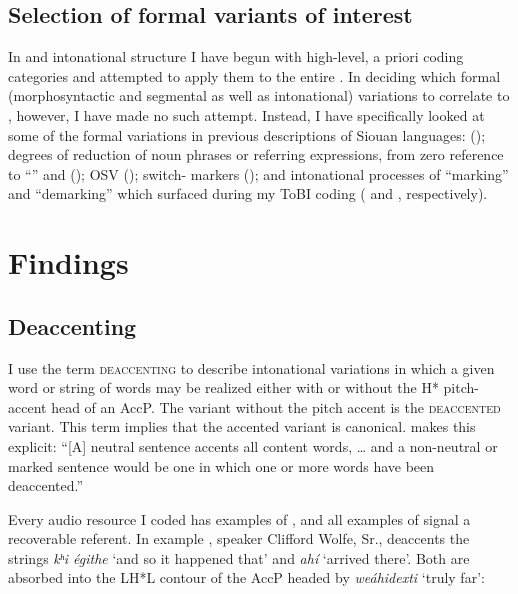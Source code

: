 \documentclass[output=paper]{LSP/langsci}
\begin{document}
\subsection{Selection of formal variants of interest}\label{variantselection}

In  and intonational structure I have begun with high-level, a priori coding categories and attempted to apply them to the entire . In deciding which formal (morphosyntactic and segmental as well as intonational) variations to correlate to , however, I have made no such attempt. Instead, I have specifically looked at some of the formal variations in previous descriptions of Siouan languages:  (); degrees of reduction of noun phrases or referring expressions, from zero reference to “” and  (); OSV  (); switch- markers (); and intonational processes of “marking” and “demarking” which surfaced during my ToBI coding ( and , respectively).

\section{Findings}\label{findings}

\subsection{Deaccenting}\label{deaccenting}

	I use the term \textsc{deaccenting} to describe intonational variations in which a given word or string of words may be realized either with or without the H* pitch-accent head of an AccP. The variant without the pitch accent is the \textsc{deaccented} variant. This term implies that the accented variant is canonical. \citet[100]{Bolinger1986} makes this explicit: “[A] neutral sentence accents all content words, … and a non-neutral or marked sentence would be one in which one or more words have been deaccented.”
	
Every audio resource I coded has examples of , and all examples of  signal a recoverable referent. In example ,  speaker Clifford Wolfe, Sr., deaccents the strings \textit{kʰi égithe} `and so it happened that' and \textit{ahí} `arrived there'. Both are absorbed into the LH*L contour of the AccP headed by \textit{weáhidexti} `truly far':
\end{document}
